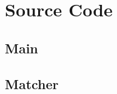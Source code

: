 \section{Source Code}



\subsection{Main}
\label{app:main_cpp}

\bigskip
\bigskip

\subsection{Matcher}
\label{app:matcher}

\bigskip
\bigskip


\bigskip
\bigskip
